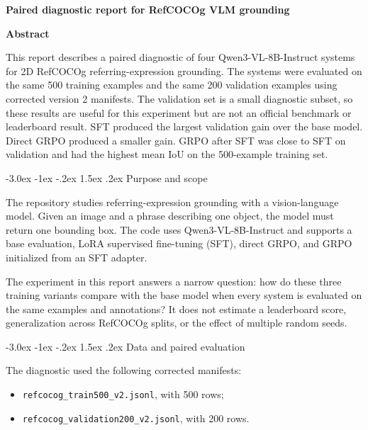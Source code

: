 \documentclass[11pt]{article}
\makeatletter
\renewcommand{\section}{\@startsection{section}{1}{\z@}%
  {-3.0ex \@plus -1ex \@minus -.2ex}%
  {1.5ex \@plus .2ex}%
  {\normalfont\normalsize\bfseries}}
\renewenvironment{abstract}
  {\par\noindent\textbf{Abstract}\par\normalfont\normalsize}
  {\par\medskip}
\makeatother
\begin{document}
\noindent\textbf{Paired diagnostic report for RefCOCOg VLM grounding}\par
\vspace{0.75em}
\raggedright

\begin{abstract}
This report describes a paired diagnostic of four Qwen3-VL-8B-Instruct systems
for 2D RefCOCOg referring-expression grounding. The systems were evaluated on
the same 500 training examples and the same 200 validation examples using
corrected version 2 manifests. The validation set is a small diagnostic subset,
so these results are useful for this experiment but are not an official
benchmark or leaderboard result. SFT produced the largest validation gain over
the base model. Direct GRPO produced a smaller gain. GRPO after SFT was close
to SFT on validation and had the highest mean IoU on the 500-example training
set.
\end{abstract}

\section{Purpose and scope}

The repository studies referring-expression grounding with a vision-language
model. Given an image and a phrase describing one object, the model must return
one bounding box. The code uses Qwen3-VL-8B-Instruct and supports a base
evaluation, LoRA supervised fine-tuning (SFT), direct GRPO, and GRPO initialized
from an SFT adapter.

The experiment in this report answers a narrow question: how do these three
training variants compare with the base model when every system is evaluated
on the same examples and annotations? It does not estimate a leaderboard score,
generalization across RefCOCOg splits, or the effect of multiple random seeds.

\section{Data and paired evaluation}

The diagnostic used the following corrected manifests:

\begin{itemize}
  \item \texttt{refcocog\_train500\_v2.jsonl}, with 500 rows;
  \item \texttt{refcocog\_validation200\_v2.jsonl}, with 200 rows.
\end{itemize}
\end{document}
